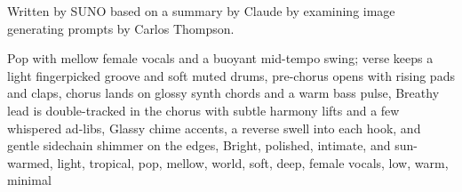 
\begin{notes}
Written by SUNO based on a summary by Claude by examining image generating prompts by Carlos Thompson.
\end{notes}
\begin{style}
Pop with mellow female vocals and a buoyant mid-tempo swing; verse keeps a light fingerpicked groove and soft muted drums, pre-chorus opens with rising pads and claps, chorus lands on glossy synth chords and a warm bass pulse, Breathy lead is double-tracked in the chorus with subtle harmony lifts and a few whispered ad-libs, Glassy chime accents, a reverse swell into each hook, and gentle sidechain shimmer on the edges, Bright, polished, intimate, and sun-warmed, light, tropical, pop, mellow, world, soft, deep, female vocals, low, warm, minimal
\end{style}
